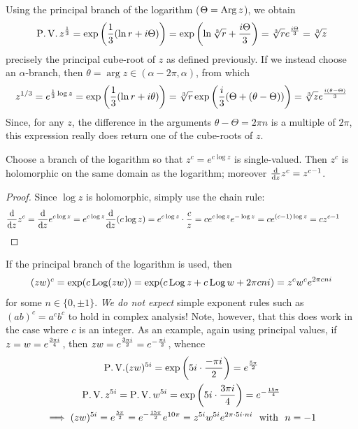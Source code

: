 \begin{example}{}{}
	Using the principal branch of the logarithm ($\Theta=\operatorname{Arg} z$), we obtain
	\[
		\operatorname{P.V.}z^{\frac 13}=\exp\left(\frac 13(\ln r+i\Theta)\right) =\exp\left(\ln \sqrt[3]{r}+\frac{i\Theta}3\right)=\sqrt[3]{r}e^{\frac{i\Theta}{3}} =\sqrt[3]{z}
	\]
	precisely the principal cube-root of $z$ as defined previously.\smallbreak
	If we instead choose an $\alpha$-branch, then $\theta=\arg z\in(\alpha-2\pi,\alpha)$, from which
	\[
		z^{1/3}=e^{\frac 13\log z}=\exp\left(\frac 13(\ln r+i\theta)\right) =\sqrt[3]{r}\exp\left(\frac i3(\Theta+(\theta-\Theta))\right) =\sqrt[3]{z}e^{\frac{i(\theta-\Theta)}{3}}
	\]
	Since, for any $z$, the difference in the arguments $\theta-\Theta=2\pi n$ is a multiple of $2\pi$, this expression really does return one of the cube-roots of $z$.
\end{example}

\begin{lemm}{}{}
	Choose a branch of the logarithm so that $z^c=e^{c\log z}$ is single-valued. Then $z^c$ is holomorphic on the same domain as the logarithm; moreover $\frac{\mathrm{d} }{\mathrm{d} z}z^c=z^{c-1}$.
\end{lemm}

\begin{proof}
	Since $\log z$ is holomorphic, simply use the chain rule:
	\[
		\frac{\mathrm{d} }{\mathrm{d} z}z^c=\frac{\mathrm{d} }{\mathrm{d} z}e^{c\log z}=e^{c\log z}\frac{\mathrm{d} }{\mathrm{d} z}(c\log z)=e^{c\log z}\cdot\frac cz =ce^{c\log z}e^{-\log z}=ce^{(c-1)\log z}=cz^{c-1}\tag*{\qedhere}
	\]
\end{proof}

\begin{example}{}{}
	If the principal branch of the logarithm is used, then
  \[
  	(zw)^c=\exp(c\operatorname{Log}(zw))=\exp(c\operatorname{Log} z+c\operatorname{Log} w+2\pi cn i)=z^cw^ce^{2\pi cn i}
  \]
  for some $n\in\{0,\pm 1\}$. \emph{We do not expect} simple exponent rules such as $(ab)^c=a^cb^c$ to hold in complex analysis! Note, however, that this does work in the case where $c$ is an integer.\smallbreak
  As an example, again using principal values, if $z=w=e^{\frac{3\pi i}{4}}$, then $zw=e^{\frac{3\pi i}{2}}=e^{-\frac{\pi i}{2}}$, whence
  \begin{gather*}
  	\operatorname{P.V.}(zw)^{5i}=\exp\left(5i\cdot \frac{-\pi i}2\right) =e^{\frac{5\pi}{2}}\\
  	\operatorname{P.V.}z^{5i}=\operatorname{P.V.}w^{5i}=\exp\left(5i\cdot \frac{3\pi i}4\right) =e^{-\frac{15\pi}{4}}\\
  	\implies (zw)^{5i} =e^{\frac{5\pi}{2}} = e^{-\frac{15\pi}{2}}e^{10\pi} =z^{5i}w^{5i} e^{2\pi\cdot 5i\cdot ni}\ \text{ with } \ n=-1
  \end{gather*}
\end{example}



